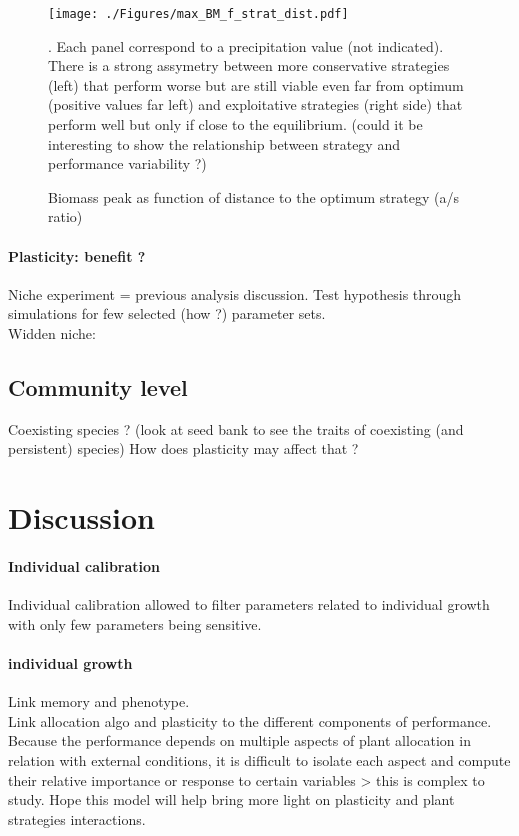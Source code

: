 \documentclass[review]{elsarticle}
\begin{document}
\begin{figure}
\texttt{[image: ./Figures/max\_BM\_f\_strat\_dist.pdf]}
\caption{Biomass peak as function of distance to the optimum strategy (a/s ratio)}. Each panel correspond to a precipitation value (not indicated). There is a strong assymetry between more conservative strategies (left) that perform worse but are still viable even far from optimum (positive values far left) and exploitative strategies (right side) that perform well but only if close to the equilibrium. (could it be interesting to show the relationship between strategy and performance variability ?) 

\end{figure}

\paragraph{Plasticity: benefit ?}
Niche experiment = previous analysis discussion. Test hypothesis through simulations for few selected (how ?) parameter sets.\\
Widden niche: 

\subsection{Community level}

Coexisting species ? (look at seed bank to see the traits of coexisting (and persistent) species)
How does plasticity may affect that ?


\section{Discussion}
\paragraph{Individual calibration}
Individual calibration allowed to filter parameters related to individual growth with only few parameters being sensitive.\\

\paragraph{individual growth}
Link memory and phenotype.\\
Link allocation algo and plasticity to the different components of performance.\\
Because the performance depends on multiple aspects of plant allocation in relation with external conditions, it is difficult to isolate each aspect and compute their relative importance or response to certain variables > this is complex to study. Hope this model will help bring more light on plasticity and plant strategies interactions.
\end{document}
